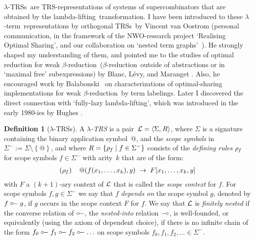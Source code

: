 \documentclass[
submission
]{dmtcs-episciences-tampered}
\makeatletter
\newcommand{\fap}[2]{#1({#2})}
\newcommand{\bfap}[3]{{#1}({#2},\hspace*{0.05pt}{#3})}
\newcommand{\indap}[2]{#1 _{#2}}
\newcommand{\supap}[2]{#1 ^{#2}}
\newcommand{\nb}{\nobreakdash}
\newcommand{\sdefdby}{{:=}}
\newcommand{\defdby}{\mathrel{\sdefdby}}
\newcommand{\tuple}[1]{\langle #1 \rangle}
\newcommand{\tuplespace}{\hspace*{0.5pt}}
\newcommand{\pair}[2]{\tuple{#1, \tuplespace #2}}
\newcommand{\descsetexpmid}{\mathrel{\vert}}
\newcommand{\descsetexp}[2]{\left\{{#1}\descsetexpmid{#2}\right\}}
\newcommand{\setexp}[1]{\left\{{#1}\right\}}
\newcommand{\avar}{x}
\newcommand{\bvar}{y}
\newcommand{\avari}{\indap{\avar}}
\newcommand{\asig}{\Sigma}
\newcommand{\asigmin}{\supap{\asig}{-}}
\newcommand{\arules}{R}
\newcommand{\alTRS}{{\cal L}}
\newcommand{\TRS}{TRS}
\newcommand{\TRSs}{TRSs}
\newcommand{\sfolapp}{@}
\newcommand{\folapp}{\bfap{\sfolapp}}
\newcommand{\afoscopesym}{f}
\newcommand{\bfoscopesym}{g}
\newcommand{\afoscopesymi}{\indap{\afoscopesym}}
\newcommand{\afoscope}{\fap{\afoscopesym}}
\newcommand{\cxtap}[2]{{#1}[#2]}
\newcommand{\afoscopecxt}{F}
\newcommand{\afoscopecxtap}{\cxtap{\afoscopecxt}}
\newcommand{\ruleof}[1]{\indap{\rho}{\hspace*{-0.3pt}#1}}
\newcommand{\smyleftspoon}{\hbox{${\circ}\kern-1.3pt{\relbar}$}}
\newcommand{\smyrightspoon}{\hbox{${\relbar}\kern-1.2pt{\circ}$}}
\newcommand{\sdependson}{\smyleftspoon}
\newcommand{\dependson}{\mathrel{\sdependson}}
\newcommand{\sisnestedinto}{\smyrightspoon}
\newcommand{\sred}{\to}
\newcommand{\lambdaterm}{$\lambda$\nb-term}
\newcommand{\lambdalifting}{lambda-lif\-ting}
\newcommand{\betareduction}{$\beta$\nb-re\-duc\-tion}
\newcommand{\TRSrepresentation}{\TRS\nb-re\-pre\-sen\-ta\-tion}
\newcommand{\lTRS}{$\lambda$\hspace*{-0.5pt}\nb-\hspace*{-0.5pt}\TRS}
\newcommand{\lTRSs}{\lTRS{s}}
\theoremstyle{plain}
\theoremstyle{definition}
\newtheorem{definition}[theorem]{Definition}
\makeatother
\begin{document}
\lTRSs\ are \TRSrepresentation{s} of systems of supercombinators that are obtained by the \lambdalifting\ transformation.
I have been introduced to these \lambdaterm\ representations by orthogonal \TRSs\ by Vincent van Oostrom
(personal communication, in the framework of the NWO-research project `Realising Optimal Sharing',
 and our collaboration on `nested term graphs'~\cite{grab:oost:2015}). 
He strongly shaped my understanding of them, and pointed me to the studies of optimal reduction for weak \betareduction\ 
(\betareduction\ outside of abstractions or in `maximal free' subexpressions)
by Blanc, L\'{e}vy, and Maranget \cite{blan:levy:mara:2005}.
Also, he encouraged work by Balabonski~\cite{bala:2012} on characterizations of optimal-sharing implementations for weak \betareduction\ 
by term labelings.
Later I discovered the direct connection with `fully-lazy \lambdalifting',
which was introduced in the early 1980-ies by Hughes \cite{hugh:1982:report,hugh:1982}. 


\begin{definition}[\lTRS{s}]\label{def:lTRS}
  A \emph{\lTRS}  
  is a pair~$\alTRS = \pair{\asig}{\arules}$, 
  where $\asig$ is a signature containing the binary application symbol~$\sfolapp$,
  and the \emph{scope symbols} in $\asigmin \defdby \asig \setminus \setexp{\sfolapp}$,
  and where $\arules = \descsetexp{ \ruleof{\afoscopesym} }{ \afoscopesym\in\asigmin }$
  consists of the \emph{defining rules} $\ruleof{\afoscopesym}$ for scope symbols $\afoscopesym\in\asigmin$ with arity~$k$
  that are of the form: 
  \begin{align*}
    (\ruleof{\afoscopesym}) \;\;\;\;
    \folapp{\afoscope{\avari{1},\ldots,\avari{k}}}{\bvar}
      \;\sred\;
    \afoscopecxtap{\avari{1},\ldots,\avari{k},\bvar}
  \end{align*}
  with $\afoscopecxt$ a $(k+1)$\nb-ary context of $\alTRS$ 
  that is called the \emph{scope context} for $\afoscopesym$.
  For scope symbols $\afoscopesym,\bfoscopesym\in\asigmin$ 
  we say that $\afoscopesym$ \emph{depends on} the scope symbol $\bfoscopesym$,
  denoted by $\afoscopesym \dependson \bfoscopesym$,
if $\bfoscopesym$ occurs in the scope context $\afoscopecxt$ for $\afoscopesym$.
We say that $\alTRS$ is \emph{finitely nested} 
  if the converse relation of $\sdependson$, the \emph{nested-into} relation $\sisnestedinto$, is well-founded,
  or equivalently (using the axiom of dependent choice),
  if there is no infinite chain of the form
  $\afoscopesymi{0} \dependson \afoscopesymi{1} \dependson \afoscopesymi{2} \dependson \ldots$
  on scope symbols $\afoscopesymi{0},\afoscopesymi{1},\afoscopesymi{2},\ldots\in\asigmin$.  
\end{definition}
\end{document}

